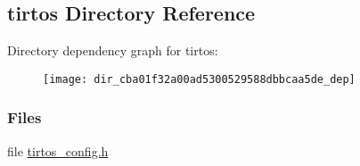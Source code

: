 \subsection{tirtos Directory Reference}
\label{dir_cba01f32a00ad5300529588dbbcaa5de}
Directory dependency graph for tirtos\+:
\nopagebreak
\begin{figure}[H]
\begin{center}
\leavevmode
\texttt{[image: dir\_cba01f32a00ad5300529588dbbcaa5de\_dep]}
\end{center}
\end{figure}
\subsubsection*{Files}
\begin{DoxyCompactItemize}
\item 
file \hyperlink{tirtos__config_8h}{tirtos\+\_\+config.\+h}
\end{DoxyCompactItemize}

